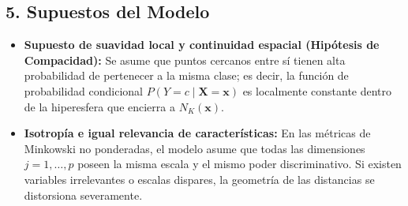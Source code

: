 \documentclass[11pt, a4paper]{article}
\begin{document}
\subsection*{5. Supuestos del Modelo}
\begin{itemize}
    \item \textbf{Supuesto de suavidad local y continuidad espacial (Hipótesis de Compacidad):} Se asume que puntos cercanos entre sí tienen alta probabilidad de pertenecer a la misma clase; es decir, la función de probabilidad condicional $P(Y = c \mid \mathbf{X} = \mathbf{x})$ es localmente constante dentro de la hiperesfera que encierra a $N_K(\mathbf{x})$.
    \item \textbf{Isotropía e igual relevancia de características:} En las métricas de Minkowski no ponderadas, el modelo asume que todas las dimensiones $j = 1, \dots, p$ poseen la misma escala y el mismo poder discriminativo. Si existen variables irrelevantes o escalas dispares, la geometría de las distancias se distorsiona severamente.
\end{itemize}
\end{document}
